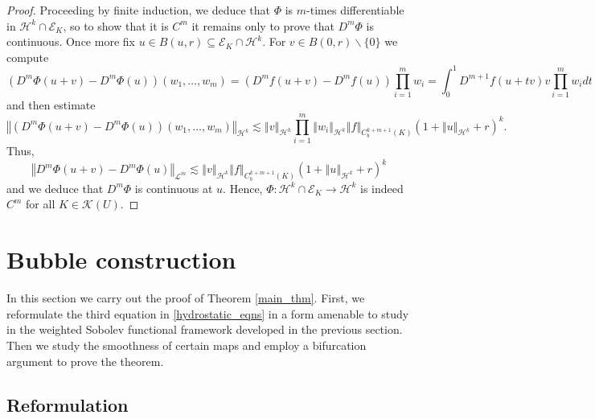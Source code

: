 \documentclass[11pt,reqno]{amsart}
\numberwithin{equation}{section}
\providecommand{\norm}[1]{\left\Vert#1\right\Vert}
\def\ls{\lesssim}
\providecommand{\norm}[1]{\left\Vert#1\right\Vert}
\def\ls{\lesssim}
\def\h{\mathcal{H}}
\def\L{\mathcal{L}}
\begin{document}
\begin{proof}
Proceeding by finite induction, we deduce that $\Phi$ is $m$-times differentiable in $\h^k \cap \mathcal{E}_K$, so to show that it is $C^m$ it remains only to prove that $D^m\Phi$ is continuous.  Once more fix $u \in B(u,r) \subseteq \mathcal{E}_K \cap \h^k$.  For $v \in B(0,r) \backslash \{0\}$ we compute 
\begin{equation}
(D^m \Phi(u+v)  - D^m\Phi(u)) (w_1,\dotsc,w_m) = (D^m f(u+v) -D^m f(u)) \prod_{i=1}^m w_i  
= \int_0^1 D^{m+1} f(u+tv)v \prod_{i=1}^m w_i dt 
\end{equation}
and then estimate 
\begin{equation}
 \norm{(D^m \Phi(u+v)  - D^m\Phi(u)) (w_1,\dotsc,w_m)}_{\h^k} \ls \norm{v}_{\h^k} \prod_{i=1}^m \norm{w_i}_{\h^k} \norm{f}_{C^{k+m+1}_b(K)} (1+ \norm{u}_{\h^k} + r)^k.
\end{equation}
Thus, 
\begin{equation}
  \norm{D^m \Phi(u+v)  - D^m\Phi(u) }_{\L^m} \ls \norm{v}_{\h^k} \norm{f}_{C^{k+m+1}_b(K)} (1+ \norm{u}_{\h^k} + r)^k
\end{equation}
and we deduce that $D^m \Phi$ is continuous at $u$.  Hence, $\Phi : \h^k \cap \mathcal{E}_K \to \h^k$ is indeed $C^m$ for all $K \in \mathcal{K}(U)$.
\end{proof}



\section{Bubble construction }
 
In this section we carry out the proof of Theorem \ref{main_thm}.  First, we reformulate the third equation in \eqref{hydrostatic_eqns} in a form amenable to study in the weighted Sobolev functional framework developed in the previous section.  Then we study the smoothness of certain maps and employ a bifurcation argument to prove the theorem.
 
 
\subsection{Reformulation}
 
\end{document}
